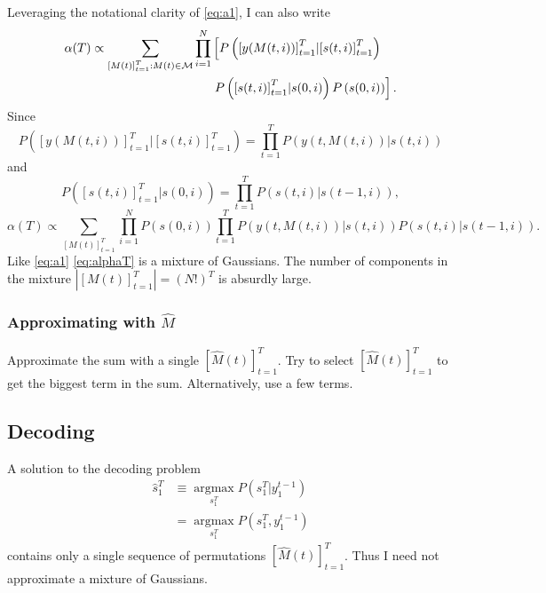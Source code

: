 \documentclass[12pt]{article}
\newcommand{\M}{{\cal M}}
\newcommand{\os}[4]{{\left[ #1(#2) \right]}_{#3}^{#4}} %
\newcommand{\ti}[2]{{#1}{(#2)}}                         %
\newcommand{\ts}[4]{\os{#1}{#2}{#2=#3}{#4}} %
\newcommand{\argmax}{\operatorname*{argmax}}
\begin{document}
Leveraging the notational clarity of \eqref{eq:a1}, I can also write
\begin{align*}
  \ti{\alpha}{T} \propto \sum_{\os{M}{t}{t=1}{T}:\ti{M}{t}\in \M}
  \prod_{i=1}^N& \left[
  P\left( \os{y}{\ti{M}{t,i}}{t=1}{T} | \os{s}{t,i}{t=1}{T}\right) \right. \\
  & \left. P\left( \os{s}{t,i}{t=1}{T}| \ti{s}{0,i} \right)
  P\left( \ti{s}{0,i} \right) \right] .
\end{align*}
Since
\begin{equation*}
  P\left( \os{y}{\ti{M}{t,i}}{t=1}{T} | \os{s}{t,i}{t=1}{T}\right) =
  \prod_{t=1}^T P\left( \ti{y}{t,\ti{M}{t,i}} | \ti{s}{t,i}\right)
\end{equation*}
and
\begin{equation*}
  P\left( \os{s}{t,i}{t=1}{T}| \ti{s}{0,i} \right) = \prod_{t=1}^T
  P\left( \ti{s}{t,i} | \ti{s}{t-1,i}\right),
\end{equation*}
\begin{equation}
  \label{eq:alphaT}
  \ti{\alpha}{T} \propto \sum_{\os{M}{t}{t=1}{T}}
  \prod_{i=1}^N  P\left( \ti{s}{0,i} \right) \prod_{t=1}^T
  P\left( \ti{y}{t,\ti{M}{t,i}} | \ti{s}{t,i}\right)
  P\left( \ti{s}{t,i} | \ti{s}{t-1,i}\right).
\end{equation}
Like \eqref{eq:a1} \eqref{eq:alphaT} is a mixture of Gaussians.  The
number of components in the mixture $\left| \ts{M}{t}{1}{T}\right| =
(N!)^T$ is absurdly large.

\subsubsection{Approximating with $\hat M$}
\label{sec:Mhat.filter1}

Approximate the sum with a single $\ts{\hat M}{t}{1}{T}$.  Try to select
$\ts{\hat M}{t}{1}{T}$ to get the biggest term in the sum.
Alternatively, use a few terms.

\subsection{Decoding}
\label{sec:decode1}

A solution to the decoding problem
\begin{align*}
  \hat s_1^T &\equiv \argmax_{s_1^T} P(s_1^T|y_1^{t-1}) \\
            &=  \argmax_{s_1^T} P(s_1^T,y_1^{t-1})
\end{align*}
contains only a single sequence of permutations $\ts{\hat
  M}{t}{1}{T}$.  Thus I need not approximate a mixture of Gaussians.
\end{document}
